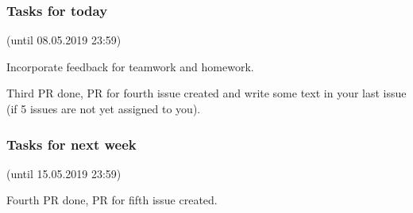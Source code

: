 \begin{assignment}
	\frametitle{Tasks for today}
	(until 08.05.2019 23:59)
	
	\begin{task}
	Incorporate feedback for teamwork and homework.
	\end{task}

	\begin{task}
	Third PR done, PR for fourth issue created and write some text in your last issue (if 5 issues are not yet assigned to you).
	\end{task}
\end{assignment}

\begin{assignment}
	\frametitle{Tasks for next week}
	(until 15.05.2019 23:59)

	\begin{task}
	Fourth PR done, PR for fifth issue created.
	\end{task}
\end{assignment}


